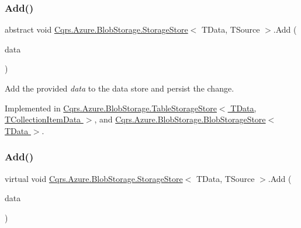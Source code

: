 \subsubsection{\texorpdfstring{Add()}{Add()}\hspace{0.1cm}{\footnotesize\ttfamily [1/2]}}
{\footnotesize\ttfamily abstract void \hyperlink{classCqrs_1_1Azure_1_1BlobStorage_1_1StorageStore}{Cqrs.\+Azure.\+Blob\+Storage.\+Storage\+Store}$<$ T\+Data, T\+Source $>$.Add (\begin{DoxyParamCaption}\item[{T\+Data}]{data }\end{DoxyParamCaption})\hspace{0.3cm}{\ttfamily [pure virtual]}}



Add the provided {\itshape data}  to the data store and persist the change. 



Implemented in \hyperlink{classCqrs_1_1Azure_1_1BlobStorage_1_1TableStorageStore_ad9becfb4b149c645450deba342696e54_ad9becfb4b149c645450deba342696e54}{Cqrs.\+Azure.\+Blob\+Storage.\+Table\+Storage\+Store$<$ T\+Data, T\+Collection\+Item\+Data $>$}, and \hyperlink{classCqrs_1_1Azure_1_1BlobStorage_1_1BlobStorageStore_a527ef0e0d39f9e01f4112b6bc90129b2_a527ef0e0d39f9e01f4112b6bc90129b2}{Cqrs.\+Azure.\+Blob\+Storage.\+Blob\+Storage\+Store$<$ T\+Data $>$}.

\mbox{\label{classCqrs_1_1Azure_1_1BlobStorage_1_1StorageStore_a989d749e5f9efc10b1a416feec02657d_a989d749e5f9efc10b1a416feec02657d}} 
\subsubsection{\texorpdfstring{Add()}{Add()}\hspace{0.1cm}{\footnotesize\ttfamily [2/2]}}
{\footnotesize\ttfamily virtual void \hyperlink{classCqrs_1_1Azure_1_1BlobStorage_1_1StorageStore}{Cqrs.\+Azure.\+Blob\+Storage.\+Storage\+Store}$<$ T\+Data, T\+Source $>$.Add (\begin{DoxyParamCaption}\item[{I\+Enumerable$<$ T\+Data $>$}]{data }\end{DoxyParamCaption})\hspace{0.3cm}{\ttfamily [virtual]}}



